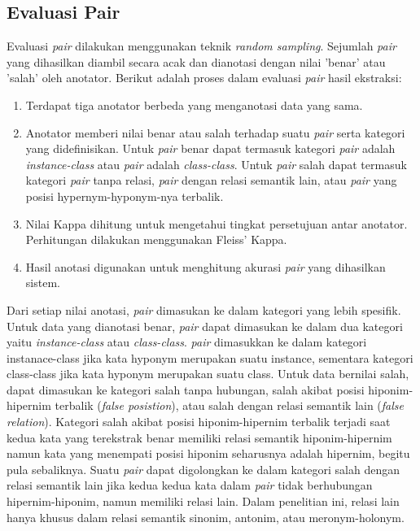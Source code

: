 \subsection{Evaluasi Pair}
Evaluasi \textit{pair} dilakukan menggunakan teknik \textit{random sampling}. Sejumlah \textit{pair} yang dihasilkan diambil secara acak dan dianotasi dengan nilai 'benar' atau 'salah' oleh anotator. Berikut adalah proses dalam evaluasi \textit{pair} hasil ekstraksi:
\begin{enumerate}
  \item Terdapat tiga anotator berbeda yang menganotasi data yang sama. 
  \item Anotator memberi nilai benar atau salah terhadap suatu \textit{pair} serta kategori yang didefinisikan. Untuk \textit{pair} benar dapat termasuk kategori \textit{pair} adalah \textit{instance-class} atau \textit{pair} adalah \textit{class-class}. Untuk \textit{pair} salah dapat termasuk kategori \textit{pair} tanpa relasi, \textit{pair} dengan relasi semantik lain, atau \textit{pair} yang posisi hypernym-hyponym-nya terbalik. 
  \item Nilai Kappa dihitung untuk mengetahui tingkat persetujuan antar anotator. Perhitungan dilakukan menggunakan Fleiss' Kappa.
  \item Hasil anotasi digunakan untuk menghitung akurasi \textit{pair} yang dihasilkan sistem.
\end{enumerate}

Dari setiap nilai anotasi, \textit{pair} dimasukan ke dalam kategori yang lebih spesifik. Untuk data yang dianotasi benar, \textit{pair} dapat dimasukan ke dalam dua kategori yaitu \textit{instance-class} atau \textit{class-class}. \textit{pair} dimasukkan ke dalam kategori instanace-class jika kata hyponym merupakan suatu instance, sementara kategori class-class jika kata hyponym merupakan suatu class. Untuk data bernilai salah, dapat dimasukan ke kategori salah tanpa hubungan, salah akibat posisi hiponim-hipernim terbalik (\textit{false posistion}), atau salah dengan relasi semantik lain (\textit{false relation}). Kategori salah akibat posisi hiponim-hipernim terbalik terjadi saat kedua kata yang terekstrak benar memiliki relasi semantik hiponim-hipernim namun kata yang menempati posisi hiponim seharusnya adalah hipernim, begitu pula sebaliknya. Suatu \textit{pair} dapat digolongkan ke dalam kategori salah dengan relasi semantik lain jika kedua kedua kata dalam \textit{pair} tidak berhubungan hipernim-hiponim, namun memiliki relasi lain. Dalam penelitian ini, relasi lain hanya khusus dalam relasi semantik sinonim, antonim, atau meronym-holonym.
